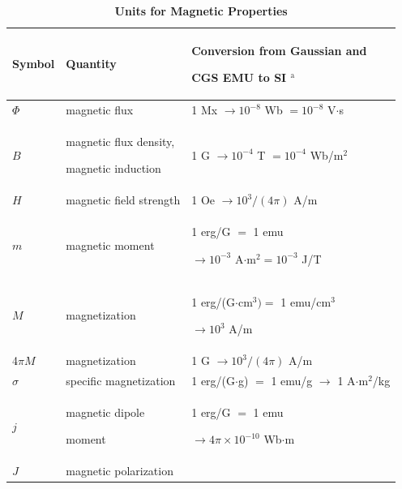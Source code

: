 \documentclass{ieeeaccess}
\begin{document}
\begin{table}
	\caption{\textbf{Units for Magnetic Properties}}
	\label{table}
	\setlength{\tabcolsep}{3pt}
	\begin{tabular}{|p{25pt}|p{75pt}|p{115pt}|}
		\hline
		Symbol                                         &
		Quantity                                       &
		Conversion from Gaussian and \par CGS EMU to SI $^{\mathrm{a}}$                 \\
		\hline
		$\Phi $                                        &
		magnetic flux                                  &
		1 Mx $\to  10^{-8}$ Wb $= 10^{-8}$ V$\cdot $s                                   \\
		$B$                                            &
		magnetic flux density, \par magnetic induction &
		1 G $\to  10^{-4}$ T $= 10^{-4}$ Wb/m$^{2}$                                     \\
		$H$                                            &
		magnetic field strength                        &
		1 Oe $\to  10^{3}/(4\pi )$ A/m                                                  \\
		$m$                                            &
		magnetic moment                                &
		1 erg/G $=$ 1 emu \par $\to 10^{-3}$ A$\cdot $m$^{2} = 10^{-3}$ J/T             \\
		$M$                                            &
		magnetization                                  &
		1 erg/(G$\cdot $cm$^{3}) =$ 1 emu/cm$^{3}$ \par $\to 10^{3}$ A/m                \\
		4$\pi M$                                       &
		magnetization                                  &
		1 G $\to  10^{3}/(4\pi )$ A/m                                                   \\
		$\sigma $                                      &
		specific magnetization                         &
		1 erg/(G$\cdot $g) $=$ 1 emu/g $\to $ 1 A$\cdot $m$^{2}$/kg                     \\
		$j$                                            &
		magnetic dipole \par moment                    &
		1 erg/G $=$ 1 emu \par $\to 4\pi \times  10^{-10}$ Wb$\cdot $m                  \\
		$J$                                            &
		magnetic polarization                          &

\end{tabular}
\end{table}
\end{document}
